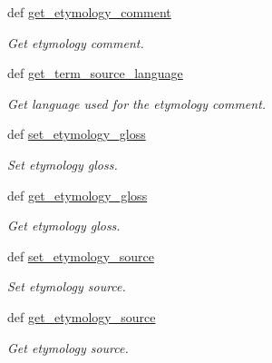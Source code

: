 \begin{DoxyCompactItemize}
def \hyperlink{classlmf_1_1src_1_1core_1_1definition_1_1_definition_aded2ab7ad4cf7d437a795d2d861278b4}{get\+\_\+etymology\+\_\+comment}
\begin{DoxyCompactList}\small\item\em Get etymology comment. \end{DoxyCompactList}\item 
def \hyperlink{classlmf_1_1src_1_1core_1_1definition_1_1_definition_a6e50bf6e6745b8bd9b473144f28c51b6}{get\+\_\+term\+\_\+source\+\_\+language}
\begin{DoxyCompactList}\small\item\em Get language used for the etymology comment. \end{DoxyCompactList}\item 
def \hyperlink{classlmf_1_1src_1_1core_1_1definition_1_1_definition_acc298f1512cabc232b93600e169d2f89}{set\+\_\+etymology\+\_\+gloss}
\begin{DoxyCompactList}\small\item\em Set etymology gloss. \end{DoxyCompactList}\item 
def \hyperlink{classlmf_1_1src_1_1core_1_1definition_1_1_definition_ac254957109847f1b5551ce2cc30d3998}{get\+\_\+etymology\+\_\+gloss}
\begin{DoxyCompactList}\small\item\em Get etymology gloss. \end{DoxyCompactList}\item 
def \hyperlink{classlmf_1_1src_1_1core_1_1definition_1_1_definition_a3105eceee6a4975183d655df3a731bb6}{set\+\_\+etymology\+\_\+source}
\begin{DoxyCompactList}\small\item\em Set etymology source. \end{DoxyCompactList}\item 
def \hyperlink{classlmf_1_1src_1_1core_1_1definition_1_1_definition_a112fe099d33e869c0b97de8956200d05}{get\+\_\+etymology\+\_\+source}
\begin{DoxyCompactList}\small\item\em Get etymology source. \end{DoxyCompactList}\end{DoxyCompactItemize}
